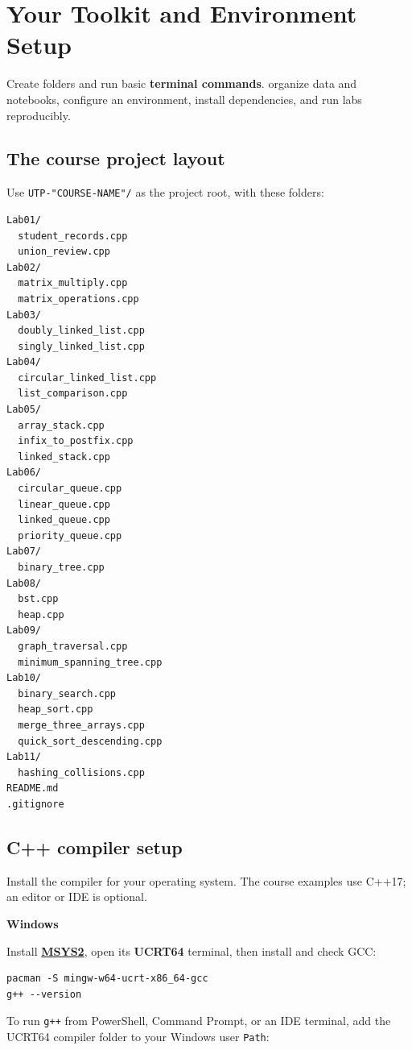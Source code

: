 \chapter{Your Toolkit and Environment Setup}
\label{ch:python}

\chapterguide%
  {Create folders and run basic \textbf{terminal commands}.}
  {organize data and notebooks, configure an environment, install dependencies, and run labs reproducibly.}

\section{The course project layout}

Use \texttt{UTP-"COURSE-NAME"/} as the project root, with these folders:

\begin{lstlisting}[style=utpterminal]
Lab01/
  student_records.cpp
  union_review.cpp
Lab02/
  matrix_multiply.cpp
  matrix_operations.cpp
Lab03/
  doubly_linked_list.cpp
  singly_linked_list.cpp
Lab04/
  circular_linked_list.cpp
  list_comparison.cpp
Lab05/
  array_stack.cpp
  infix_to_postfix.cpp
  linked_stack.cpp
Lab06/
  circular_queue.cpp
  linear_queue.cpp
  linked_queue.cpp
  priority_queue.cpp
Lab07/
  binary_tree.cpp
Lab08/
  bst.cpp
  heap.cpp
Lab09/
  graph_traversal.cpp
  minimum_spanning_tree.cpp
Lab10/
  binary_search.cpp
  heap_sort.cpp
  merge_three_arrays.cpp
  quick_sort_descending.cpp
Lab11/
  hashing_collisions.cpp
README.md
.gitignore
\end{lstlisting}
\clearpage
\section{C++ compiler setup}

Install the compiler for your operating system. The course examples use C++17; an editor or IDE is optional.

\medskip
\noindent\textbf{Windows}\par
\noindent Install \href{https://www.msys2.org/}{\textbf{MSYS2}}, open its
\textbf{UCRT64} terminal, then install and check GCC:

\begin{lstlisting}[style=utpterminal]
pacman -S mingw-w64-ucrt-x86_64-gcc
g++ --version
\end{lstlisting}

\noindent To run \texttt{g++} from PowerShell, Command Prompt, or an IDE
terminal, add the UCRT64 compiler folder to your Windows user \texttt{Path}:

